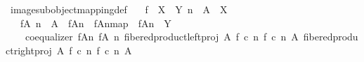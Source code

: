 \begin{isabellebody}
\isanewline
{}\isamarkupfalse%
\ image{\isacharunderscore}{\kern0pt}subobject{\isacharunderscore}{\kern0pt}mapping{\isacharunderscore}{\kern0pt}def{}{\isacharcolon}{\kern0pt}\isanewline
\ \ \ {\isachardoublequoteopen}f\ {\isacharcolon}{\kern0pt}\ X\ {\isasymrightarrow}\ Y{\isachardoublequoteclose}\ {\isachardoublequoteopen}n\ {\isacharcolon}{\kern0pt}\ A\ {\isasymrightarrow}\ X{\isachardoublequoteclose}\isanewline
\ \ \ {\isachardoublequoteopen}f{\isasymrestriction}\isactrlbsub {\isacharparenleft}{\kern0pt}A{\isacharcomma}{\kern0pt}\ n{\isacharparenright}{\kern0pt}\isactrlesub \ {\isacharcolon}{\kern0pt}\ A\ {\isasymrightarrow}\ f{\isasymlparr}A{\isasymrparr}\isactrlbsub n\isactrlesub \ {\isasymand}\ {\isacharbrackleft}{\kern0pt}f{\isasymlparr}A{\isasymrparr}\isactrlbsub n\isactrlesub {\isacharbrackright}{\kern0pt}map\ {\isacharcolon}{\kern0pt}\ f{\isasymlparr}A{\isasymrparr}\isactrlbsub n\isactrlesub \ {\isasymrightarrow}\ Y\ {\isasymand}\isanewline
\ \ \ \ coequalizer\ {\isacharparenleft}{\kern0pt}f{\isasymlparr}A{\isasymrparr}\isactrlbsub n\isactrlesub {\isacharparenright}{\kern0pt}\ {\isacharparenleft}{\kern0pt}f{\isasymrestriction}\isactrlbsub {\isacharparenleft}{\kern0pt}A{\isacharcomma}{\kern0pt}\ n{\isacharparenright}{\kern0pt}\isactrlesub {\isacharparenright}{\kern0pt}\ {\isacharparenleft}{\kern0pt}fibered{\isacharunderscore}{\kern0pt}product{\isacharunderscore}{\kern0pt}left{\isacharunderscore}{\kern0pt}proj\ A\ {\isacharparenleft}{\kern0pt}f\ {\isasymcirc}\isactrlsub c\ n{\isacharparenright}{\kern0pt}\ {\isacharparenleft}{\kern0pt}f\ {\isasymcirc}\isactrlsub c\ n{\isacharparenright}{\kern0pt}\ A{\isacharparenright}{\kern0pt}\ {\isacharparenleft}{\kern0pt}fibered{\isacharunderscore}{\kern0pt}product{\isacharunderscore}{\kern0pt}right{\isacharunderscore}{\kern0pt}proj\ A\ {\isacharparenleft}{\kern0pt}f\ {\isasymcirc}\isactrlsub c\ n{\isacharparenright}{\kern0pt}\ {\isacharparenleft}{\kern0pt}f\ {\isasymcirc}\isactrlsub c\ n{\isacharparenright}{\kern0pt}\ A{\isacharparenright}{\kern0pt}\ {\isasymand}\isanewline

\end{isabellebody}

